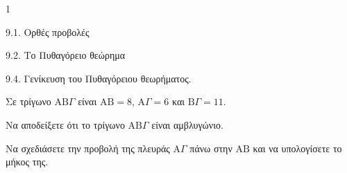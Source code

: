 \begin{ylh}{1}
    \item 9.1. Ορθές προβολές
    \item 9.2. Το Πυθαγόρειο θεώρημα
    \item 9.4. Γενίκευση του Πυθαγόρειου θεωρήματος.
\end{ylh}
Σε τρίγωνο $\mathrm{AB}\Gamma$ είναι $\mathrm{AB} = 8$, $\mathrm{A}\Gamma = 6$ και $\mathrm{B}\Gamma = 11$.
\begin{alist}
\item Να αποδείξετε ότι το τρίγωνο $\mathrm{AB}\Gamma$ είναι αμβλυγώνιο. 
\item Να σχεδιάσετε την προβολή της πλευράς $\mathrm{A}\Gamma$ πάνω στην $\mathrm{AB}$ και να υπολογίσετε το μήκος της. 
\end{alist}